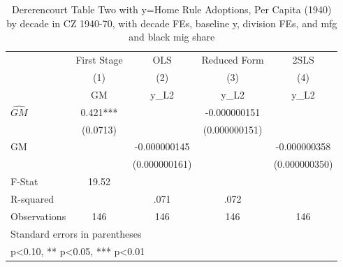 \begin{table}[htbp]\centering
\def\sym#1{\ifmmode^{#1}\else\(^{#1}\)\fi}
\caption{Dererencourt Table Two with y=Home Rule Adoptions, Per Capita (1940) by decade in CZ 1940-70, with decade FEs, baseline y, division FEs, and mfg and black mig share}
\begin{tabular}{l*{4}{c}}
\toprule
                    & First Stage   &         OLS   &Reduced Form   &        2SLS   \\
                    &\multicolumn{1}{c}{(1)}&\multicolumn{1}{c}{(2)}&\multicolumn{1}{c}{(3)}&\multicolumn{1}{c}{(4)}\\
                    &\multicolumn{1}{c}{GM}&\multicolumn{1}{c}{y\_L2}&\multicolumn{1}{c}{y\_L2}&\multicolumn{1}{c}{y\_L2}\\
\midrule
$\hat{GM}$          &       0.421***&               &-0.000000151   &               \\
                    &    (0.0713)   &               &(0.000000151)   &               \\
\addlinespace
GM                  &               &-0.000000145   &               &-0.000000358   \\
                    &               &(0.000000161)   &               &(0.000000350)   \\
\midrule
F-Stat              &       19.52   &               &               &               \\
R-squared           &               &        .071   &        .072   &               \\
Observations        &         146   &         146   &         146   &         146   \\
\bottomrule
\multicolumn{5}{l}{\footnotesize Standard errors in parentheses}\\
\multicolumn{5}{l}{\footnotesize * p<0.10, ** p<0.05, *** p<0.01}\\
\end{tabular}
\end{table}
